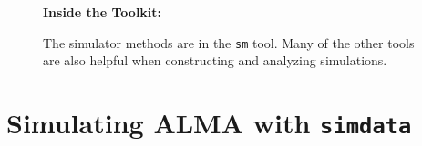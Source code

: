 \begin{wrapfigure}{r}{2.5in}
  \begin{boxedminipage}{2.5in}
     \centerline{\bf Inside the Toolkit:}
     The simulator methods are in the {\tt sm} tool.
     Many of the other tools are also helpful when
     constructing and analyzing simulations.
  \end{boxedminipage}
\end{wrapfigure}

\section{Simulating ALMA with {\tt simdata}}
\label{section:sim.almasimmos}

